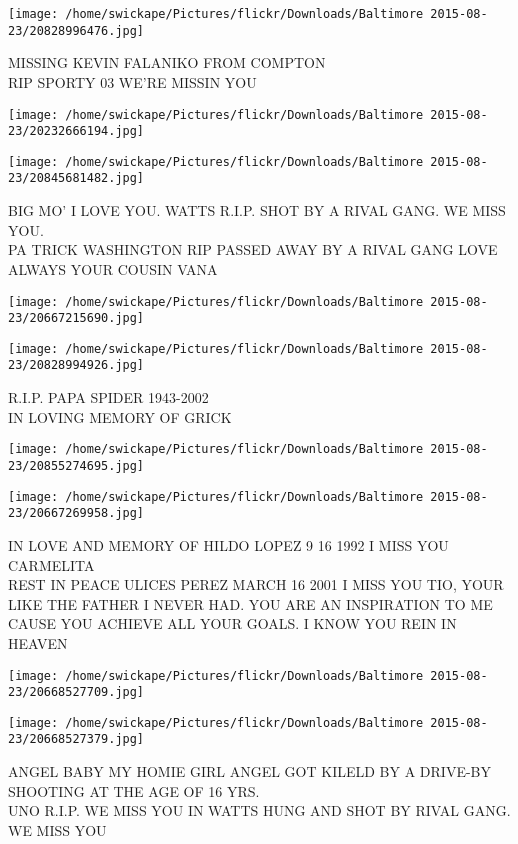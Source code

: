 \documentclass[10pt,letterpaper]{article}
\begin{document}
\vspace{0.25in}
\texttt{[image: /home/swickape/Pictures/flickr/Downloads/Baltimore 2015-08-23/20828996476.jpg]}

MISSING KEVIN FALANIKO FROM COMPTON\\
RIP SPORTY 03 WE'RE MISSIN YOU
\pagebreak

\texttt{[image: /home/swickape/Pictures/flickr/Downloads/Baltimore 2015-08-23/20232666194.jpg]}

\vspace{0.25in}
\texttt{[image: /home/swickape/Pictures/flickr/Downloads/Baltimore 2015-08-23/20845681482.jpg]}

BIG MO' I LOVE YOU. WATTS R.I.P. SHOT BY A RIVAL GANG.  WE MISS YOU.\\
PA TRICK WASHINGTON RIP PASSED AWAY BY A RIVAL GANG LOVE ALWAYS YOUR COUSIN VANA
\pagebreak

\texttt{[image: /home/swickape/Pictures/flickr/Downloads/Baltimore 2015-08-23/20667215690.jpg]}

\vspace{0.25in}
\texttt{[image: /home/swickape/Pictures/flickr/Downloads/Baltimore 2015-08-23/20828994926.jpg]}

R.I.P. PAPA SPIDER 1943{-}2002\\
IN LOVING MEMORY OF GRICK
\pagebreak

\texttt{[image: /home/swickape/Pictures/flickr/Downloads/Baltimore 2015-08-23/20855274695.jpg]}

\vspace{0.25in}
\texttt{[image: /home/swickape/Pictures/flickr/Downloads/Baltimore 2015-08-23/20667269958.jpg]}

IN LOVE AND MEMORY OF HILDO LOPEZ 9 16 1992 I MISS YOU CARMELITA\\
REST IN PEACE ULICES PEREZ MARCH 16 2001 I MISS YOU TIO, YOUR LIKE THE FATHER I NEVER HAD.  YOU ARE AN INSPIRATION TO ME CAUSE YOU ACHIEVE ALL YOUR GOALS.  I KNOW YOU REIN IN HEAVEN
\pagebreak

\texttt{[image: /home/swickape/Pictures/flickr/Downloads/Baltimore 2015-08-23/20668527709.jpg]}

\vspace{0.25in}
\texttt{[image: /home/swickape/Pictures/flickr/Downloads/Baltimore 2015-08-23/20668527379.jpg]}

ANGEL BABY MY HOMIE GIRL ANGEL GOT KILELD BY A DRIVE{-}BY SHOOTING AT THE AGE OF 16 YRS.\\
UNO R.I.P.  WE MISS YOU IN WATTS HUNG AND SHOT BY RIVAL GANG.  WE MISS YOU
\pagebreak
\end{document}
